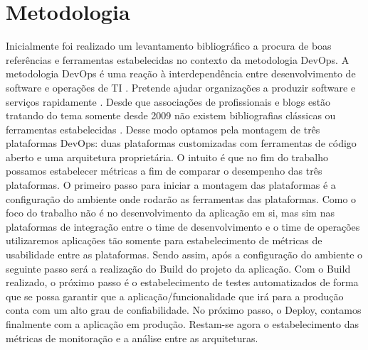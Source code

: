 \chapter{Metodologia}

Inicialmente foi realizado um levantamento bibliográfico a procura de boas 
referências e ferramentas estabelecidas no contexto da metodologia DevOps. 
A metodologia DevOps é uma reação à interdependência entre desenvolvimento 
de software e operações de TI \cite{moltchanov2015cloudwave}. Pretende 
ajudar organizações a produzir 
software e serviços rapidamente \cite{braga2015panorama}. Desde que associações de profissionais e 
blogs estão tratando do tema somente desde 2009 não existem bibliografias 
clássicas ou ferramentas estabelecidas \cite{de2016devops}. Desse modo optamos pela montagem de 
três plataformas DevOps: duas plataformas customizadas com ferramentas de 
código aberto e uma arquitetura proprietária. O intuito é que no fim do 
trabalho possamos estabelecer métricas a fim de comparar o desempenho das 
três plataformas.
O primeiro passo para iniciar a montagem das plataformas é a configuração 
do ambiente onde rodarão as ferramentas das plataformas.
Como o foco do trabalho não é no desenvolvimento da aplicação em si, mas 
sim nas plataformas de integração entre o time de desenvolvimento e o time 
de operações utilizaremos aplicações tão somente para estabelecimento de 
métricas de usabilidade entre as plataformas. Sendo assim, após a 
configuração do ambiente o seguinte passo será a realização do Build do 
projeto da aplicação.
Com o Build realizado, o próximo passo é o estabelecimento de testes 
automatizados de forma que se possa garantir que a aplicação/funcionalidade 
que irá para a produção conta com um alto grau de confiabilidade.
No próximo passo, o Deploy, contamos finalmente com a aplicação em produção. 
Restam-se agora o estabelecimento das métricas de monitoração e a análise 
entre as arquiteturas.
